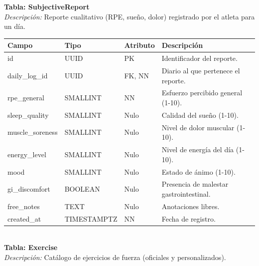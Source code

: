 \documentclass[12pt]{article}
\begin{document}
\newpage
\noindent\textbf{Tabla: SubjectiveReport} \\
\textit{Descripción:} Reporte cualitativo (RPE, sueño, dolor) registrado por el atleta para un día.
\begin{table}[h!]
    \centering
    \renewcommand{\arraystretch}{1.2}
    \small
    \begin{tabular}{|p{3.5cm}|p{2.7cm}|p{2cm}|p{6.5cm}|}
        \hline
        \rowcolor[HTML]{EFEFEF}
        \textbf{Campo} & \textbf{Tipo} & \textbf{Atributo} & \textbf{Descripción} \\ \hline
        id & UUID & PK & Identificador del reporte. \\ \hline
        daily\_log\_id & UUID & FK, NN & Diario al que pertenece el reporte. \\ \hline
        rpe\_general & SMALLINT & NN & Esfuerzo percibido general (1-10). \\ \hline
        sleep\_quality & SMALLINT & Nulo & Calidad del sueño (1-10). \\ \hline
        muscle\_soreness & SMALLINT & Nulo & Nivel de dolor muscular (1-10). \\ \hline
        energy\_level & SMALLINT & Nulo & Nivel de energía del día (1-10). \\ \hline
        mood & SMALLINT & Nulo & Estado de ánimo (1-10). \\ \hline
        gi\_discomfort & BOOLEAN & Nulo & Presencia de malestar gastrointestinal. \\ \hline
        free\_notes & TEXT & Nulo & Anotaciones libres. \\ \hline
        created\_at & TIMESTAMPTZ & NN & Fecha de registro. \\ \hline
    \end{tabular}
\end{table}
\\
\noindent\textbf{Tabla: Exercise} \\
\textit{Descripción:} Catálogo de ejercicios de fuerza (oficiales y personalizados).
\end{document}
